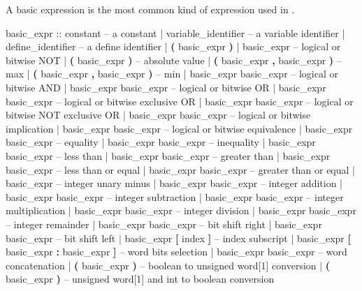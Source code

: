 A basic expression is the most common kind of expression used in
\nusmv.

\begin{Grammar}
basic_expr ::
      constant                      -- a constant
    | variable_identifier           -- a variable identifier
    | define_identifier             -- a define identifier
    | \textbf{(} basic_expr \textbf{)}
    | \operator{!} basic_expr                  -- logical or bitwise NOT
    |  \textbf{(} basic\_expr \textbf{)}                        -- absolute value
    |  \textbf{(} basic\_expr \textbf{,} basic\_expr \textbf{)} -- max
    |  \textbf{(} basic\_expr \textbf{,} basic\_expr \textbf{)} -- min
    | basic_expr \operator{\&} basic_expr       -- logical or bitwise AND
    | basic_expr \operator{|} basic_expr       -- logical or bitwise OR
    | basic_expr  basic_expr     -- logical or bitwise exclusive OR
    | basic_expr  basic_expr    -- logical or bitwise NOT exclusive OR
    | basic_expr \operator{->} basic_expr      -- logical or bitwise implication
    | basic_expr \operator{<->} basic_expr     -- logical or bitwise equivalence
    | basic_expr \operator{=} basic_expr       -- equality
    | basic_expr \operator{!=} basic_expr      -- inequality
    | basic_expr \operator{<} basic_expr       -- less than
    | basic_expr \operator{>} basic_expr       -- greater than
    | basic_expr \operator{<=} basic_expr      -- less than or equal
    | basic_expr \operator{>=} basic_expr      -- greater than or equal
    | \operator{-} basic_expr                  -- integer unary minus
    | basic_expr \operator{+} basic_expr       -- integer addition
    | basic_expr \operator{-} basic_expr       -- integer subtraction
    | basic_expr \operator{*} basic_expr       -- integer multiplication
    | basic_expr \operator{/} basic_expr       -- integer division
    | basic_expr  basic_expr     -- integer remainder
    | basic_expr \operator{>>} basic_expr      -- bit shift right
    | basic_expr \operator{<<} basic_expr      -- bit shift left
    | basic_expr \textbf{[} index \textbf{]}          -- index subscript
    | basic_expr \textbf{[} basic_expr \textbf{:} basic_expr \textbf{]}
                                    -- word bits selection
    | basic_expr \operator{::} basic_expr      -- word concatenation
    |  \textbf{(} basic_expr \textbf{)}          -- boolean to unsigned word[1] conversion
    |  \textbf{(} basic_expr \textbf{)}           -- unsigned word[1] and int to boolean conversion

\end{Grammar}
